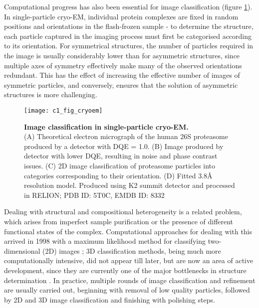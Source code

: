 \documentclass[a4paper,11pt,twoside,openright]{scrbook}
\begin{document}
Computational progress has also been essential for image classification (figure
\ref{figure:cryoem}). In single-particle cryo-EM, individual protein complexes
are fixed in random positions and orientations in the flash-frozen sample - to
determine the structure, each particle captured in the imaging process must
first be categorised according to its orientation. For symmetrical structures,
the number of particles required in the image is usually considerably lower than
for asymmetric structures, since multiple axes of symmetry effectively make many
of the observed orientations redundant. This has the effect of increasing the
effective number of images of symmetric particles, and conversely, ensures that
the solution of asymmetric structures is more challenging.

\begin{figure}
    \texttt{[image: c1\_fig\_cryoem]}
    \caption[Image classification in single-particle cryo-EM]{\sffamily
    \textbf{Image classification in single-particle cryo-EM.} \\ \small (A)
    Theoretical electron micrograph of the human 26S proteasome produced by a
    detector with DQE = 1.0. (B) Image produced by detector with lower DQE,
    resulting in noise and phase contrast issues. (C) 2D image classification of
    proteasome particles into categories corresponding to their orientation. (D)
    Fitted 3.8Å resolution model. Produced using K2 summit detector and
    processed in RELION; PDB ID: 5T0C, EMDB ID: 8332 \cite{Chen2016}}
    \label{figure:cryoem}
\end{figure}

Dealing with structural and compositional heterogeneity is a related problem,
which arises from imperfect sample purification or the presence of different
functional states of the complex. Computational approaches for dealing with this
arrived in 1998 with a maximum likelihood method for classifying two-dimensional
(2D) images \cite{Sigworth1998}; 3D classification methods, being much more
computationally intensive, did not appear till later, but are now an area of
active development, since they are currently one of the major bottlenecks in
structure determination \cite{Scheres2007,Lyumkis2013,Punjani2017}. In practice,
multiple rounds of image classification and refinement are usually carried out,
beginning with removal of low quality particles, followed by 2D and 3D image
classification and finishing with polishing steps.
\end{document}
